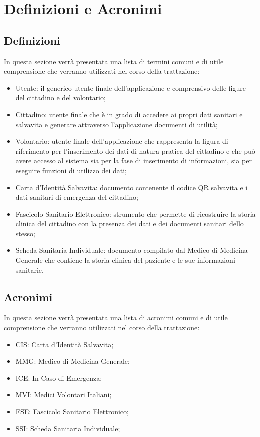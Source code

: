 \documentclass[12pt,a4paper,twoside,openright,titlepage]{book}
\begin{document}
%

%



%

\chapter*{Definizioni e Acronimi}
\section*{Definizioni}
In questa sezione verrà presentata una lista di termini comuni e di utile comprensione che verranno utilizzati nel corso della trattazione:
\begin{itemize}
\item Utente: il generico utente finale dell'applicazione e comprensivo delle figure del cittadino e del volontario;
\item Cittadino: utente finale che è in grado di accedere ai propri dati sanitari e salvavita e generare attraverso l'applicazione documenti di utilità;
\item Volontario: utente finale dell'applicazione che rappresenta la figura di riferimento per l'inserimento dei dati di natura pratica del cittadino e che può avere accesso al sistema sia per la fase di inserimento di informazioni, sia per eseguire funzioni di utilizzo dei dati;
\item Carta d'Identità Salvavita: documento contenente il codice QR salvavita e i dati sanitari di emergenza del cittadino;
\item Fascicolo Sanitario Elettronico: strumento che permette di ricostruire la storia clinica del cittadino con la presenza dei dati e dei documenti sanitari dello stesso;
\item Scheda Sanitaria Individuale: documento compilato dal Medico di Medicina Generale che contiene la storia clinica del paziente e le sue informazioni sanitarie.
\end{itemize}

\section*{Acronimi}
In questa sezione verrà presentata una lista di acronimi comuni e di utile comprensione che verranno utilizzati nel corso della trattazione:
\begin{itemize}
\item CIS: Carta d'Identità Salvavita;
\item MMG: Medico di Medicina Generale;
\item ICE: In Caso di Emergenza;
\item MVI: Medici Volontari Italiani;
\item FSE: Fascicolo Sanitario Elettronico;
\item SSI: Scheda Sanitaria Individuale;
\end{itemize}
\cleardoublepage
\end{document}
